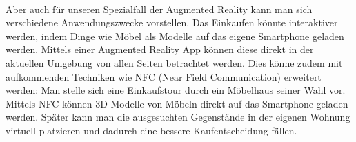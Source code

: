 \paragraph{}
Aber auch für unseren Spezialfall der Augmented Reality kann man sich verschiedene Anwendungszwecke vorstellen. Das Einkaufen könnte interaktiver werden, indem Dinge wie Möbel als Modelle auf das eigene Smartphone geladen werden. Mittels einer Augmented Reality App können diese direkt in der aktuellen Umgebung von allen Seiten betrachtet werden. Dies könne zudem mit aufkommenden Techniken wie NFC (Near Field Communication) erweitert werden: Man stelle sich eine Einkaufstour durch ein Möbelhaus seiner Wahl vor. Mittels NFC können 3D-Modelle von Möbeln direkt auf das Smartphone geladen werden. Später kann man die ausgesuchten Gegenstände in der eigenen Wohnung virtuell platzieren und dadurch eine bessere Kaufentscheidung fällen.
